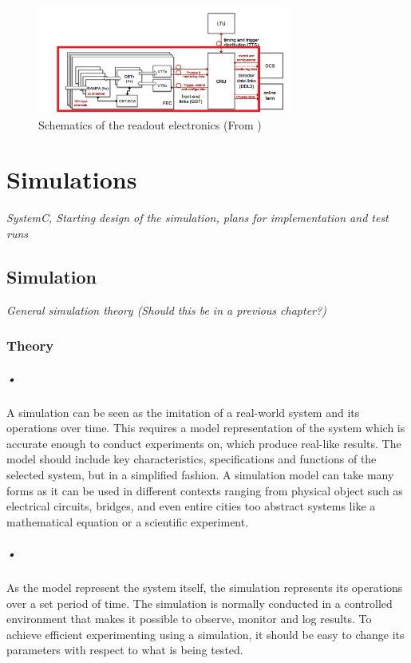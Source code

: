 \documentclass[a4paper]{report}
\begin{document}
\begin{figure}[h!]
	\centering
		\includegraphics[width=0.75\textwidth]{images/fec.png}
		\caption{Schematics of the readout electronics (From \cite{tdr-016})}
		\label{fig:pad-struct}
\end{figure}

\chapter{Simulations}
\label{cha:4}
\textit{SystemC, Starting design of the simulation, plans for implementation and test runs}

\section{Simulation}
\textit{General simulation theory (Should this be in a previous chapter?)}

\subsection{Theory}
\paragraph{•}
A simulation can be seen as the imitation of a real-world system and its operations over time.
This requires a model representation of the system which is accurate enough to conduct experiments on, which produce real-like results.
The model should include key characteristics, specifications and functions of the selected system, but in a simplified fashion.
A simulation model can take many forms as it can be used in different contexts ranging from physical object such as electrical circuits, bridges, and even entire cities too abstract systems like a mathematical equation or a scientific experiment. %

\paragraph{•}
As the model represent the system itself, the simulation represents its operations over a set period of time.
The simulation is normally conducted in a controlled environment that makes it possible to observe, monitor and log results.
To achieve efficient experimenting using a simulation, it should be easy to change its parameters with respect to what is being tested.
\end{document}
